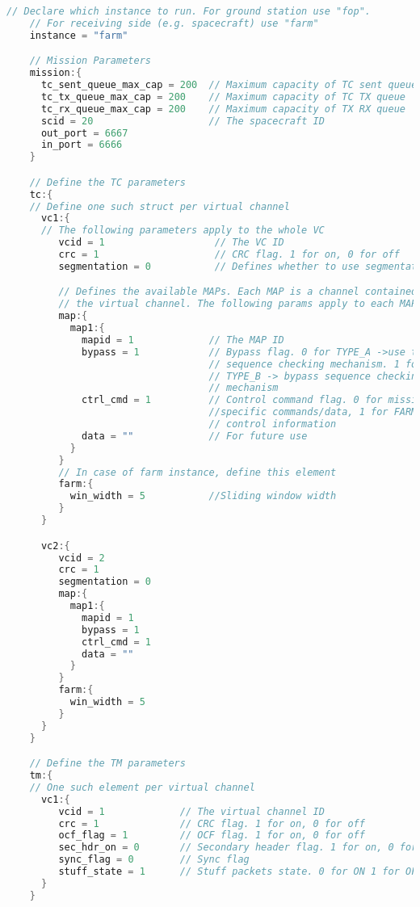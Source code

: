 \documentclass[english,title,a4paper]{report}
\begin{document}
\begin{lstlisting}[language=C, caption = FARM example configuration]
    // Declare which instance to run. For ground station use "fop".
    // For receiving side (e.g. spacecraft) use "farm"
    instance = "farm"

    // Mission Parameters
    mission:{
      tc_sent_queue_max_cap = 200  // Maximum capacity of TC sent queue
      tc_tx_queue_max_cap = 200    // Maximum capacity of TC TX queue
      tc_rx_queue_max_cap = 200    // Maximum capacity of TX RX queue
      scid = 20                    // The spacecraft ID
      out_port = 6667
      in_port = 6666
    }

    // Define the TC parameters
    tc:{
    // Define one such struct per virtual channel
      vc1:{
      // The following parameters apply to the whole VC
         vcid = 1                   // The VC ID
         crc = 1                    // CRC flag. 1 for on, 0 for off
         segmentation = 0           // Defines whether to use segmentation

         // Defines the available MAPs. Each MAP is a channel contained into
         // the virtual channel. The following params apply to each MAP
         map:{
           map1:{
             mapid = 1             // The MAP ID
             bypass = 1            // Bypass flag. 0 for TYPE_A ->use the
                                   // sequence checking mechanism. 1 for
                                   // TYPE_B -> bypass sequence checking
                                   // mechanism
             ctrl_cmd = 1          // Control command flag. 0 for mission
                                   //specific commands/data, 1 for FARM
                                   // control information
             data = ""             // For future use
           }
         }
         // In case of farm instance, define this element
         farm:{
           win_width = 5           //Sliding window width
         }
      }

      vc2:{
         vcid = 2
         crc = 1
         segmentation = 0
         map:{
           map1:{
             mapid = 1
             bypass = 1
             ctrl_cmd = 1
             data = ""
           }
         }
         farm:{
           win_width = 5
         }
      }
    }

    // Define the TM parameters
    tm:{
    // One such element per virtual channel
      vc1:{
         vcid = 1             // The virtual channel ID
         crc = 1              // CRC flag. 1 for on, 0 for off
         ocf_flag = 1         // OCF flag. 1 for on, 0 for off
         sec_hdr_on = 0       // Secondary header flag. 1 for on, 0 for off
         sync_flag = 0        // Sync flag
         stuff_state = 1      // Stuff packets state. 0 for ON 1 for OFF
      }
    }
\end{lstlisting}
\end{document}

